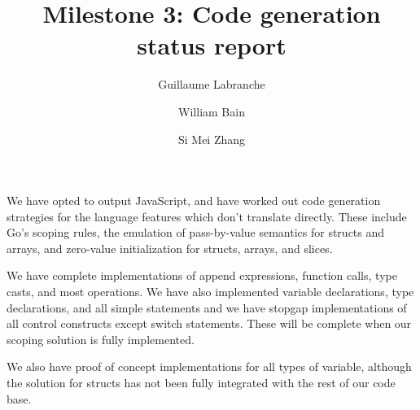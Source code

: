 \documentclass[oneside]{article}
\begin{document}
\title{Milestone 3: Code generation status report}
\author{Guillaume Labranche \and William Bain \and Si Mei Zhang}
\maketitle

We have opted to output JavaScript, and have worked out code generation strategies for the language features which don't translate directly. These include Go's scoping rules, the emulation of pass-by-value semantics for structs and arrays, and zero-value initialization for structs, arrays, and slices.

We have complete implementations of append expressions, function calls, type casts, and most operations. We have also implemented variable declarations, type declarations, and all simple statements and we have stopgap implementations of all control constructs except switch statements. These will be complete when our scoping solution is fully implemented.

We also have proof of concept implementations for all types of variable, although the solution for structs has not been fully integrated with the rest of our code base.
\end{document}
